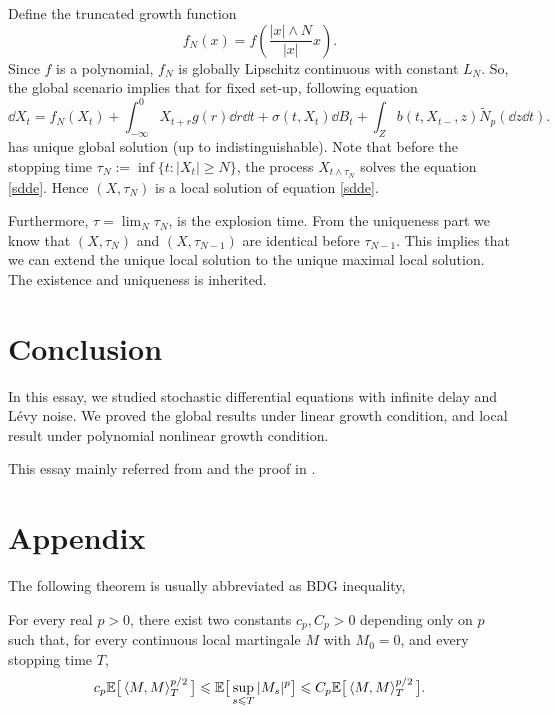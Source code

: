 \documentclass[8pt,onesided]{article}
\begin{document}
Define the truncated growth function
\begin{equation*}
    f_N(x)=f(\frac{|x|\wedge N}{|x|}x).
\end{equation*}
Since $f$ is a polynomial, $f_N$ is globally Lipschitz continuous with constant $L_N$. So, the global scenario implies that for fixed set-up, following equation
\begin{equation*}
    \dd X_t=f_N(X_t)+\int_{ -\infty}^0 X_{t+r} g(r) \dd r \dd t+\sigma(t,X_t)\dd B_t+\int_Z b(t, X_{t-},z)\tilde N_p(\dd z \dd t).
\end{equation*}
has unique global solution (up to indistinguishable). Note that before the stopping time $\tau_N:=\inf\{t:|X_t|\ge N\}$, the process $X_{t\wedge \tau_N}$ solves the equation \ref{sdde}. Hence $(X,\tau_N)$ is a local solution of equation \ref{sdde}.

Furthermore, $\tau=\lim_{N} \tau_N$, is the explosion time. From the uniqueness part we know that $(X,\tau_N)$ and $(X,\tau_{N-1})$ are identical before $\tau_{N-1}$. This implies that we can extend the unique local solution to the unique maximal local solution. The existence and uniqueness is inherited.


\section{Conclusion}

In this essay, we studied stochastic differential equations with infinite delay and L\'evy noise. We proved the global results under linear growth condition, and local result under polynomial nonlinear growth condition.

This essay mainly referred from \cite{WEI2007516} and the proof in \cite[Theorem 8.3]{gall2016brownian}.

\section*{Appendix}

The following theorem is usually abbreviated as BDG inequality, \cite[Theorem 5.16]{gall2016brownian}
\begin{theorem}
\label{bdg}
For every real $p>0$, there exist two constants $c_p, C_p>0$ depending only on $p$ such that, for every continuous local martingale $M$ with $M_0=0$, and every stopping time $T$,
\begin{equation*}
c_p\mathbb{E} \big[\left\langle M,M\right\rangle_{T}^{p/2} \big]\leqslant \mathbb{E}\big[\sup_{s\leqslant T}|M_s|^p\big]\leqslant C_p \mathbb{E}\big[\left\langle M,M\right\rangle_T^{p/2}\big].
\end{equation*}
\end{theorem}
\end{document}
